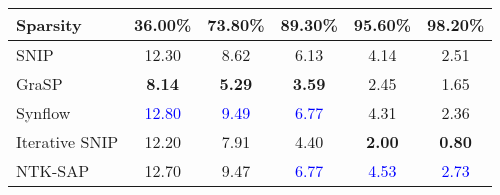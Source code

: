 \begin{table*}
\begin{center}
{\begin{tabular}{l ccccc}
    \bottomrule
    \end{tabular}
    }
    
    \end{center}
        \begin{center}
    \caption{Inference FLOPs ($\times 10^{7}$) comparison on Tiny-ImageNet(ResNet-18). Results with the largest FLOPs are in \textcolor{blue}{blue} and results with the smallest FLOPs are in \textbf{bold}.}     \label{tab:appendix-flops-inf-tiny}
    {
    \begin{tabular}{l ccccc}
    \\
    \hline
    \toprule
    Sparsity & 36.00\% & 73.80\% & 89.30\% & 95.60\% & 98.20\% \\
    \midrule
    SNIP & 12.30 & 8.62 & 6.13 & 4.14 & 2.51  \\
    GraSP & \textbf{8.14} & \textbf{5.29} & \textbf{3.59} & 2.45 & 1.65 \\
    Synflow & \textcolor{blue}{12.80} & \textcolor{blue}{9.49} & \textcolor{blue}{6.77} & 4.31 & 2.36  \\
    Iterative SNIP & 12.20 & 7.91 & 4.40 & \textbf{2.00} & \textbf{0.80} \\
    NTK-SAP & 12.70 & 9.47 & \textcolor{blue}{6.77} & \textcolor{blue}{4.53} & \textcolor{blue}{2.73} \\

    \bottomrule
    \end{tabular}
    }
    
    \end{center}
\end{table*}